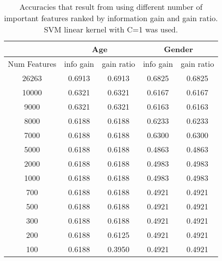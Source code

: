 \documentclass[a4paper]{llncs}
\begin{document}
\begin{table}[!htbp]
\centering
\begin{tabular}{|c|c|c|c|c|}
\hline
                                   & \multicolumn{2}{c|}{Age} & \multicolumn{2}{c|}{Gender} \\ \hline
\multicolumn{1}{|l|}{Num Features} & info gain  & gain ratio  & info gain    & gain ratio   \\ \hline
26263                              & 0.6913     & 0.6913      & 0.6825       & 0.6825       \\ \hline
10000                              & 0.6321     & 0.6321      & 0.6167       & 0.6167       \\ \hline
9000                               & 0.6321     & 0.6321      & 0.6163       & 0.6163       \\ \hline
8000                               & 0.6188     & 0.6188      & 0.6233       & 0.6233       \\ \hline
7000                               & 0.6188     & 0.6188      & 0.6300       & 0.6300       \\ \hline
5000                               & 0.6188     & 0.6188      & 0.4863       & 0.4863       \\ \hline
2000                               & 0.6188     & 0.6188      & 0.4983       & 0.4983       \\ \hline
1000                               & 0.6188     & 0.6188      & 0.4983       & 0.4983       \\ \hline
700                                & 0.6188     & 0.6188      & 0.4921       & 0.4921       \\ \hline
500                                & 0.6188     & 0.6188      & 0.4921       & 0.4921       \\ \hline
300                                & 0.6188     & 0.6188      & 0.4921       & 0.4921       \\ \hline
200                                & 0.6188     & 0.6125      & 0.4921       & 0.4921       \\ \hline
100                                & 0.6188     & 0.3950      & 0.4921       & 0.4921       \\ \hline
\end{tabular}
\caption{Accuracies that result from using different number of important features ranked by information gain and gain ratio. SVM linear kernel with C=1 was used.}
\label{table:ChoosingNumFeatures}
\end{table}
\end{document}
